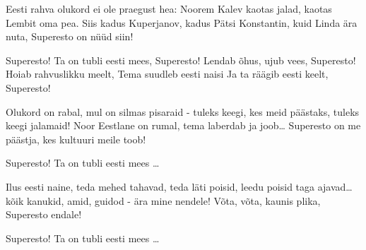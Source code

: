 Eesti rahva olukord ei ole praegust hea:
Noorem Kalev kaotas jalad, kaotas Lembit oma pea.
Siis kadus Kuperjanov, kadus P\"atsi Konstantin,
kuid Linda \"ara nuta, Superesto on n\"u\"ud siin!

Superesto! Ta on tubli eesti mees, 
Superesto! Lendab \~ohus, ujub vees,
Superesto! Hoiab rahvuslikku meelt,
Tema suudleb eesti naisi
Ja ta r\"a\"agib eesti keelt, Superesto!

Olukord on rabal, mul on silmas pisaraid -
tuleks keegi, kes meid p\"a\"astaks,
tuleks keegi jalamaid!
Noor Eestlane on rumal, tema laberdab ja joob\ldots
Superesto on me p\"a\"astja,
kes kultuuri meile toob!

Superesto! Ta on tubli eesti mees \ldots

Ilus eesti naine, teda mehed tahavad,
teda l\"ati poisid, leedu poisid taga ajavad\ldots
k\~oik kanukid, amid, guidod - \"ara mine nendele!
V\~ota, v\~ota, kaunis plika, Superesto endale!

Superesto! Ta on tubli eesti mees \ldots
